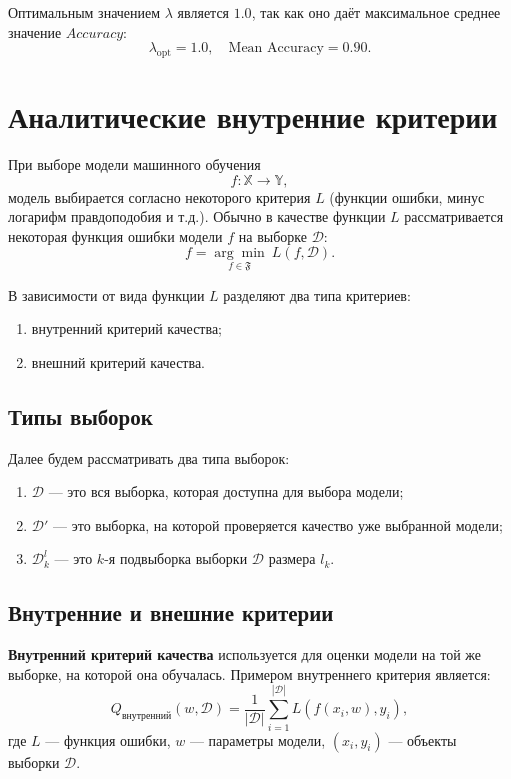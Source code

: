 Оптимальным значением $\lambda$ является $1.0$, так как оно даёт максимальное среднее значение $Accuracy$:
\[
\lambda_{\text{opt}} = 1.0, \quad \text{Mean Accuracy} = 0.90.
\]

\section*{Аналитические внутренние критерии}

При выборе модели машинного обучения
\[
f : \mathbb{X} \to \mathbb{Y},
\]
модель выбирается согласно некоторого критерия $L$ (функции ошибки, минус логарифм правдоподобия и т.д.). Обычно в качестве функции $L$ рассматривается некоторая функция ошибки модели $f$ на выборке $\mathcal{D}$:
\[
f = \underset{f \in \mathfrak{F}}{\arg\min} \ L(f, \mathcal{D}).
\]

В зависимости от вида функции $L$ разделяют два типа критериев:
\begin{enumerate}
    \item внутренний критерий качества;
    \item внешний критерий качества.
\end{enumerate}

\subsection*{Типы выборок}
Далее будем рассматривать два типа выборок:
\begin{enumerate}
    \item $\mathcal{D}$ --- это вся выборка, которая доступна для выбора модели;
    \item $\mathcal{D}'$ --- это выборка, на которой проверяется качество уже выбранной модели;
    \item $\mathcal{D}^l_k$ --- это $k$-я подвыборка выборки $\mathcal{D}$ размера $l_k$.
\end{enumerate}

\subsection*{Внутренние и внешние критерии}
\textbf{Внутренний критерий качества} используется для оценки модели на той же выборке, на которой она обучалась. Примером внутреннего критерия является:
\[
Q_{\text{внутренний}}(w, \mathcal{D}) = \frac{1}{|\mathcal{D}|} \sum_{i=1}^{|\mathcal{D}|} L(f(x_i, w), y_i),
\]
где $L$ --- функция ошибки, $w$ --- параметры модели, $(x_i, y_i)$ --- объекты выборки $\mathcal{D}$. 

